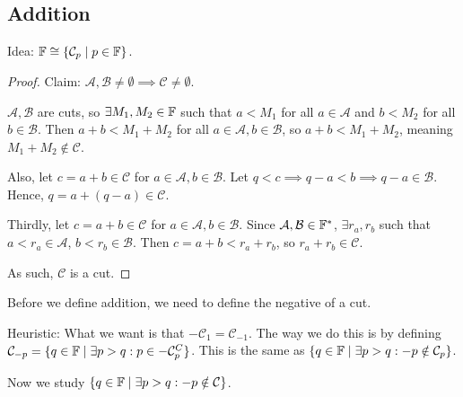 \documentclass{report}
\begin{document}
\subsection{Addition}
Idea: $\FF \cong \{ \mathcal C_p \mid p \in \FF\}$. 

\begin{proof}
    Claim: $\mathcal A, \mathcal B \neq \emptyset \implies \mathcal C \neq \emptyset$.

    $\mathcal A, \mathcal B$ are cuts, so $\exists M_1, M_2 \in \FF$ such that $a < M_1$ for all $a \in \mathcal A$ and $b < M_2$ for all $b \in \mathcal B$. Then $a + b < M_1 + M_2$ for all $a \in \mathcal A, b \in \mathcal B$, so $a + b < M_1 + M_2$, meaning $M_1 + M_2 \notin \mathcal C$.

    Also, let $c = a + b \in \mathcal C$ for $a \in \mathcal A, b \in \mathcal B$. Let $q < c \implies q-a < b \implies q - a \in \mathcal B$. Hence, $q = a + (q-a) \in \mathcal C$. 

    Thirdly, let $c = a + b \in\mathcal C$ for $a \in \mathcal A, b \in \mathcal B$. Since $\mathcal A, \mathcal B \in \FF^*$, $\exists r_a, r_b$ such that $a < r_a \in \mathcal A$, $b < r_b \in \mathcal B$. Then $c = a + b < r_a + r_b$, so $r_a + r_b \in \mathcal C$.

    As such, $\mathcal C$ is a cut.
\end{proof}
\noindent Before we define addition, we need to define the negative of a cut.


Heuristic: What we want is that $-\mathcal C_1 = \mathcal C_{-1}$. The way we do this is by defining $\mathcal C_{-p} = \{ q \in \FF \mid \exists p > q : p \in -\mathcal C_p^C\}$. This is the same as $\{ q\in \FF \mid \exists p > q : -p \notin \mathcal C_p\}$. 

Now we study $\{ q \in \FF \mid \exists p > q : -p \notin \mathcal C\}$.


\end{document}
